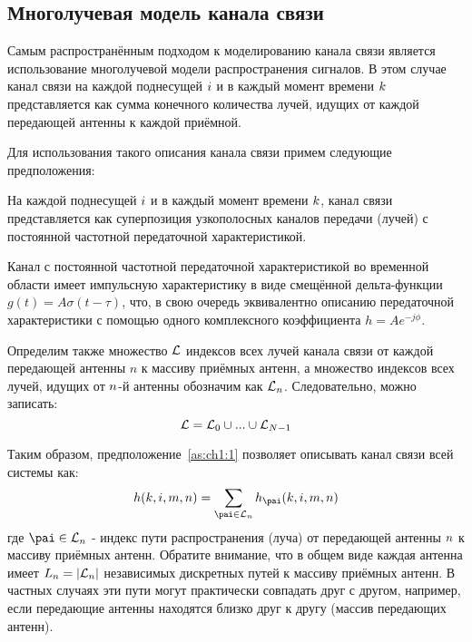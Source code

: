 \subsection{Многолучевая модель канала связи}\label{subsec:ch1/sec1/sub1}

Самым распространённым подходом к моделированию канала связи является использование многолучевой модели распространения сигналов. В этом случае канал связи на каждой поднесущей $i$ и в каждый момент времени $k$ представляется как сумма конечного количества лучей, идущих от каждой передающей антенны к каждой приёмной.

Для использования такого описания канала связи примем следующие предположения:
\begin{assumption}
\label{as:ch1:1}
На каждой поднесущей $i$ и в каждый момент времени $k$, канал связи представляется как суперпозиция узкополосных каналов передачи (лучей) с постоянной частотной передаточной характеристикой.
\end{assumption}

Канал с постоянной частотной передаточной характеристикой во временной области имеет импульсную характеристику в виде смещённой дельта-функции $g(t)=A\sigma (t-\tau)$, что, в свою очередь эквивалентно описанию передаточной характеристики с помощью одного комплексного коэффициента $h=Ae^{-j\phi}$. 

Определим также множество ${\mathcal L}$ индексов всех лучей канала связи от каждой передающей антенны $n$ к массиву приёмных антенн, а множество индексов всех лучей, идущих от ${n}$-й антенны обозначим как ${\mathcal L}_n$. Следовательно, можно записать:
\begin{equation}
\label{eq:ch1:5}
{\mathcal L} = {\mathcal L}_0 \cup ... \cup {\mathcal L}_{{N}-1}
\end{equation}

Таким образом, предположение~\ref{as:ch1:1} позволяет описывать канал связи всей системы как:
\begin{equation}
\label{eq:ch1:6}
h(\ti,\fri,\rxi,\txi)=\sum_{\pai\in\Spai} \hpa(\ti,\fri,\rxi,\txi)
\end{equation}
где $\pai\in\Spai$ - индекс пути распространения (луча) от передающей антенны ${n}$ к массиву приёмных антенн. Обратите внимание,  что в общем виде каждая антенна имеет ${L_{{n}}}=|{{\mathcal L}_{n}}|$ независимых дискретных путей к массиву приёмных антенн. В частных случаях эти пути могут практически совпадать друг с другом, например, если передающие антенны находятся близко друг к другу (массив передающих антенн).
	
